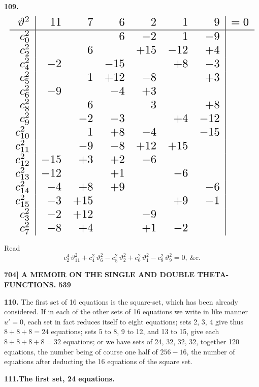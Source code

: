 \documentclass[11pt]{article}
\begin{document}
\medskip
\textbf{109.}
\[
\resizebox{\textwidth}{!}{$\displaystyle
\begin{array}{r|rrrrrr|c}
\vartheta^2 & 11 & 7 & 6 & 2 & 1 & 9 & =0\\\hline
c_0^2 & & & 6 & -2 & 1 & -9 & \\
c_2^2 & & 6 & & +15 & -12 & +4 & \\
c_4^2 & -2 & & -15 & & +8 & -3 & \\
c_5^2 & & 1 & +12 & -8 & & +3 & \\
c_6^2 & -9 & & -4 & +3 & & & \\
c_8^2 & & 6 & & 3 & & +8 & \\
c_9^2 & & -2 & -3 & & +4 & -12 & \\
c_{10}^2 & & 1 & +8 & -4 & & -15 & \\
c_{11}^2 & & -9 & -8 & +12 & +15 & & \\
c_{12}^2 & -15 & +3 & +2 & -6 & & & \\
c_{13}^2 & -12 & & +1 & & -6 & & \\
c_{14}^2 & -4 & +8 & +9 & & & -6 & \\
c_{15}^2 & -3 & +15 & & & +9 & -1 & \\
c_3^2 & -2 & +12 & & -9 & & & \\
c_7^2 & -8 & +4 & & +1 & -2 & & \\
\end{array}
$}
\]

Read
\[
c_2^4\,\vartheta_{11}^2 + c_4^2\,\vartheta_6^2 - c_5^2\,\vartheta_2^2 + c_6^2\,\vartheta_1^2 - c_8^2\,\vartheta_9^2 = 0,\ \text{\&c.}
\]

\newpage
\noindent\textbf{704] \quad A MEMOIR ON THE SINGLE AND DOUBLE THETA-FUNCTIONS. \hfill 539}

\medskip
\textbf{110.} The first set of 16 equations is the square-set, which has been already considered. If in each of the other sets of 16 equations we write in like manner $u' = 0$, each set in fact reduces itself to eight equations; sets 2, 3, 4 give thus $8 + 8 + 8 = 24$ equations; sets 5 to 8, 9 to 12, and 13 to 15, give each $8 + 8 + 8 + 8 = 32$ equations; or we have sets of 24, 32, 32, 32, together 120 equations, the number being of course one half of $256 - 16$, the number of equations after deducting the 16 equations of the square set.

\medskip
\begin{center}\textbf{111.\quad The first set, 24 equations.}\end{center}
\end{document}
